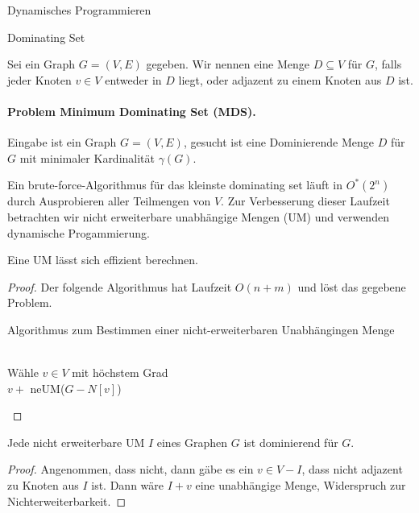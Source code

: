 \begin{chapter}{Dynamisches Programmieren}
\begin{section}{Dominating Set}
  \begin{definition}
  \label{dominating}
   Sei ein Graph \(G = (V,E)\) gegeben. Wir nennen eine Menge \(D \subseteq V\)  für $G$, falls jeder Knoten $v \in V$ entweder in $D$ liegt, oder adjazent zu einem Knoten aus $D$ ist.
  \end{definition}
  \paragraph{Problem Minimum Dominating Set (MDS).} Eingabe ist ein Graph $G=(V,E)$, gesucht ist eine Dominierende Menge $D$ für $G$ mit minimaler Kardinalität $\gamma(G)$.

  Ein brute-force-Algorithmus für das kleinste dominating set läuft in \(O^*(2^n)\) durch Ausprobieren aller Teilmengen von \(V\). Zur Verbesserung dieser Laufzeit betrachten wir nicht erweiterbare unabhängige Mengen (UM) und verwenden dynamische Progammierung. 
  
  \begin{lemma}
   Eine UM lässt sich effizient berechnen.
  \end{lemma}
  \begin{proof}
  Der folgende Algorithmus hat Laufzeit $O(n+m)$ und löst das gegebene Problem. 
  
  \begin{algorithm}[H]
    \caption{Algorithmus zum Bestimmen einer nicht-erweiterbaren Unabhängingen Menge}

     \\
    Wähle $v \in V$ mit höchstem Grad\\
    \Return $v + $ neUM($G-N[v]$)
  \end{algorithm}
  \end{proof}
  
  \begin{lemma}
   Jede nicht erweiterbare UM $I$ eines Graphen $G$ ist dominierend für $G$.
  \end{lemma}
  \begin{proof}
   Angenommen, dass nicht, dann gäbe es ein $v\in V-I$, dass nicht adjazent zu Knoten aus $I$ ist. Dann wäre $I + v$ eine unabhängige Menge, Widerspruch zur Nichterweiterbarkeit.
  \end{proof}


\end{section}
\end{chapter}
